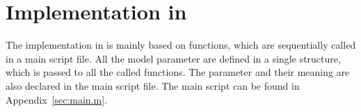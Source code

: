 
\section{Implementation in \matlab}
\label{sec:implementationMatlab}

The implementation in \matlab is mainly based on functions, which are
sequentially called in a main script file.  All the model parameter are defined
in a single structure, which is passed to all the called functions.  The
parameter and their meaning are also declared in the main script file.  The
main script can be found in Appendix~\ref{sec:main.m}.






